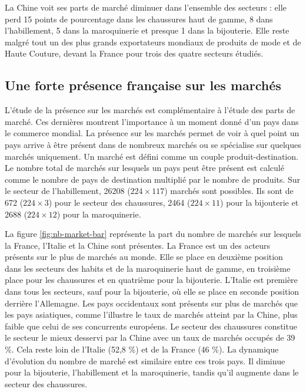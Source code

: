 \documentclass[french,10pt,a4paper]{article}
\begin{document}
La Chine voit ses parts de marché diminuer dans l'ensemble des secteurs : elle perd 15 points de pourcentage dans les chaussures haut de gamme, 8 dans l'habillement, 5 dans la maroquinerie et presque 1 dans la bijouterie. Elle reste malgré tout un des plus grands exportateurs mondiaux de produits de mode et de Haute Couture, devant la France pour trois des quatre secteurs étudiés.

\subsection{Une forte présence française sur les marchés}
L'étude de la présence sur les marchés est complémentaire à l'étude des parts de marché. Ces dernières montrent l'importance à un moment donné d'un pays dans le commerce mondial. La présence sur les marchés permet de voir à quel point un pays arrive à être présent dans de nombreux marchés ou se spécialise sur quelques marchés uniquement. Un marché est défini comme un couple produit-destination. Le nombre total de marchés sur lesquels un pays peut être présent est calculé comme le nombre de pays de destination multiplié par le nombre de produits. Sur le secteur de l'habillement, 26208 ($224 \times 117$) marchés sont possibles. Ils sont de 672 ($224 \times 3$) pour le secteur des chaussures, 2464 ($224 \times 11$) pour la bijouterie et 2688 ($224 \times 12$) pour la maroquinerie.

\bigskip

La figure \ref{fig:nb-market-bar} représente la part du nombre de marchés sur lesquels la France, l'Italie et la Chine sont présentes. La France est un des acteurs présents sur le plus de marchés au monde. Elle se place en deuxième position dans les secteurs des habits et de la maroquinerie haut de gamme, en troisième place pour les chaussures et en quatrième pour la bijouterie. L'Italie est première dans tous les secteurs, sauf pour la bijouterie, où elle se place en seconde position derrière l'Allemagne. Les pays occidentaux sont présents sur plus de marchés que les pays asiatiques, comme l'illustre le taux de marchés atteint par la Chine, plus faible que celui de ses concurrents européens. Le secteur des chaussures constitue le secteur le mieux desservi par la Chine avec un taux de marchés occupés de 39 \%. Cela reste loin de l'Italie (52,8 \%) et de la France (46 \%). La dynamique d'évolution du nombre de marché est similaire entre ces trois pays. Il diminue pour la bijouterie, l'habillement et la maroquinerie, tandis qu'il augmente dans le secteur des chaussures.
\end{document}
